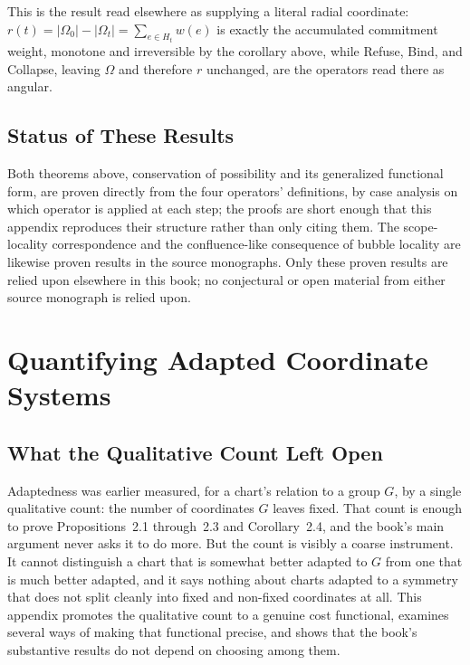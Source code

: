 \documentclass[11pt,fleqn]{book}
\numberwithin{equation}{chapter}
\theoremstyle{plain}
\theoremstyle{definition}
\theoremstyle{remark}
\begin{document}
This is the result read elsewhere as supplying a literal radial coordinate: \(r(t)=|\Omega_0|-|\Omega_t|=\sum_{e\in H_t}w(e)\) is exactly the accumulated commitment weight, monotone and irreversible by the corollary above, while Refuse, Bind, and Collapse, leaving \(\Omega\) and therefore \(r\) unchanged, are the operators read there as angular.

\section{Status of These Results}

Both theorems above, conservation of possibility and its generalized functional form, are proven directly from the four operators' definitions, by case analysis on which operator is applied at each step; the proofs are short enough that this appendix reproduces their structure rather than only citing them. The scope-locality correspondence and the confluence-like consequence of bubble locality are likewise proven results in the source monographs. Only these proven results are relied upon elsewhere in this book; no conjectural or open material from either source monograph is relied upon.



\chapter{Quantifying Adapted Coordinate Systems}

\section{What the Qualitative Count Left Open}

Adaptedness was earlier measured, for a chart's relation to a group \(G\), by a single qualitative count: the number of coordinates \(G\) leaves fixed. That count is enough to prove Propositions~2.1 through~2.3 and Corollary~2.4, and the book's main argument never asks it to do more. But the count is visibly a coarse instrument. It cannot distinguish a chart that is somewhat better adapted to \(G\) from one that is much better adapted, and it says nothing about charts adapted to a symmetry that does not split cleanly into fixed and non-fixed coordinates at all. This appendix promotes the qualitative count to a genuine cost functional, examines several ways of making that functional precise, and shows that the book's substantive results do not depend on choosing among them.
\end{document}
